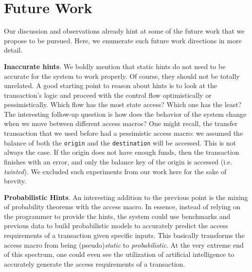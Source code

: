 \section{Future Work} \label{chap_conc:sec:future_work}

Our discussion and observations already hint at some of the future work that we propose to be
pursued. Here, we enumerate such future work directions in more detail.

\textbf{Inaccurate hints}. We boldly mention that static hints do not need to be accurate for the
system to work properly. Of course, they should not be totally unrelated. A good starting point to
reason about hints is to look at the transaction's logic and proceed with the control flow
optimistically or pessimistically. Which flow has the most state access? Which one has the least?
The interesting follow-up question is how does the behavior of the system change when we move
between different access macros? One might recall, the transfer transaction that we used before had
a pessimistic access macro: we assumed the balance of both the \texttt{origin} and the
\texttt{destination} will be accessed. This is not always the case. If the origin does not have
enough funds, then the transaction finishes with an error, and only the balance key of the origin is
accessed (i.e. \textit{tainted}). We excluded such experiments from our work here for the sake of
brevity.

\textbf{Probabilistic Hints}. An interesting addition to the previous point is the mixing of
probability theorems with the access macro. In essence, instead of relying on the programmer to
provide the hints, the system could use benchmarks and previous data to build probabilistic models
to accurately predict the access requirements of a transaction given specific inputs. This basically
transforms the access macro from being (pseudo)\textit{static} to \textit{probabilistic}. At the
very extreme end of this spectrum, one could even see the utilization of artificial intelligence to
accurately generate the access requirements of a transaction.

